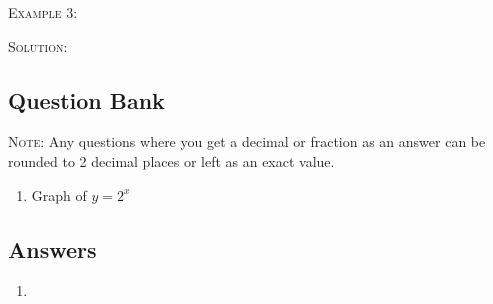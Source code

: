 \documentclass[a4paper,12pt]{article}
\begin{document}
\textsc{Example 3}: 

\textsc{Solution}: 

\newpage
\subsection*{Question Bank}

\textsc{Note}: Any questions where you get a decimal or fraction 
as an answer can be rounded to 2 decimal places or left as 
an exact value.

\begin{enumerate}
\item Graph of $y = 2^x$

\end{enumerate}

\newpage
\subsection*{Answers}

\begin{enumerate}
\item 
\end{enumerate}
\end{document}
